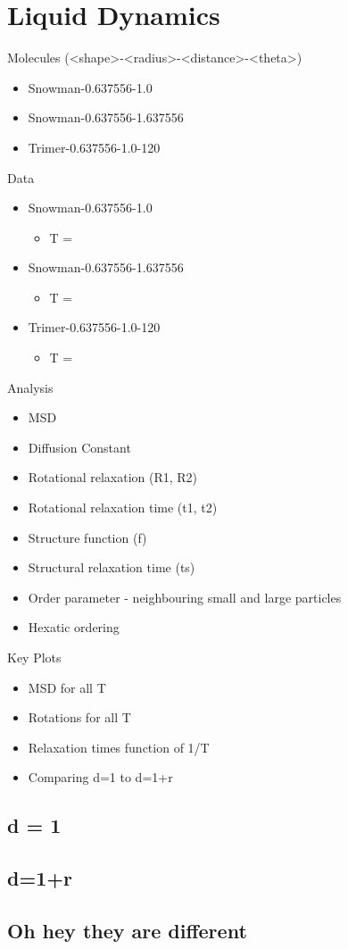 \chapter{Liquid Dynamics}

Molecules (<shape>-<radius>-<distance>-<theta>)
\begin{itemize}
    \item Snowman-0.637556-1.0
    \item Snowman-0.637556-1.637556
    \item Trimer-0.637556-1.0-120
\end{itemize}


Data
\begin{itemize}
    \item Snowman-0.637556-1.0
        \begin{itemize}
            \item T = 
        \end{itemize}
    \item Snowman-0.637556-1.637556
        \begin{itemize}
            \item T = 
        \end{itemize}
    \item Trimer-0.637556-1.0-120
        \begin{itemize}
            \item T = 
        \end{itemize}
\end{itemize}


Analysis
\begin{itemize}
    \item MSD
    \item Diffusion Constant
    \item Rotational relaxation (R1, R2)
    \item Rotational relaxation time (t1, t2)
    \item Structure function (f)
    \item Structural relaxation time (ts)
    \item Order parameter - neighbouring small and large particles
    \item Hexatic ordering
\end{itemize}

Key Plots
\begin{itemize}
    \item MSD for all T
    \item Rotations for all T
    \item Relaxation times function of 1/T
    \item Comparing d=1 to d=1+r
\end{itemize}


\section{d = 1}

 \section{d=1+r}

\section{Oh hey they are different}
